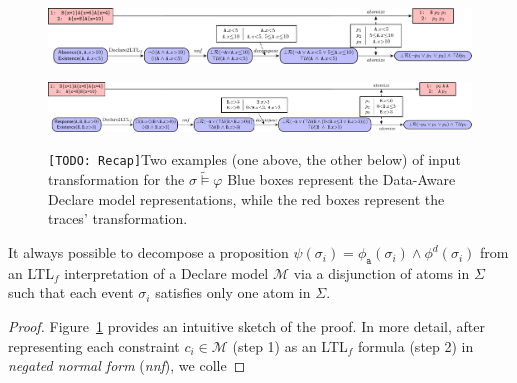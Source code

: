 \begin{figure}[!t]
	{\hspace{-1.3cm}\includegraphics[width=1.3\textwidth]{images/example_1}}
	
	{\hspace{-1.3cm}\includegraphics[width=1.3\textwidth]{images/example_2}}
	
	\caption{\texttt{[TODO: Recap]}Two examples (one above, the other below) of input transformation for the $\sigma\tilde{\vDash}\varphi$ Blue boxes represent the Data-Aware Declare model representations, while the red boxes represent the traces' transformation.}\label{fig:twoexamples}
\end{figure}
\begin{lemma}
It always possible to decompose a proposition $\psi(\sigma_i)=\phi_{\texttt{a}}(\sigma_i)\wedge \phi^d(\sigma_i)$ from an LTL$_f$ interpretation of a Declare model $\mathcal{M}$ via a disjunction of atoms in $\Sigma$ such that each event $\sigma_i$ satisfies only one atom in $\Sigma$.
\end{lemma}
\begin{proof}
Figure~\ref{fig:twoexamples} provides an intuitive sketch of the proof. In more detail, after representing each constraint $c_i\in\mathcal{M}$ (step 1) as an LTL$_f$ formula (step 2) in \textit{negated normal form} (\textit{nnf}), we colle
\end{proof}

